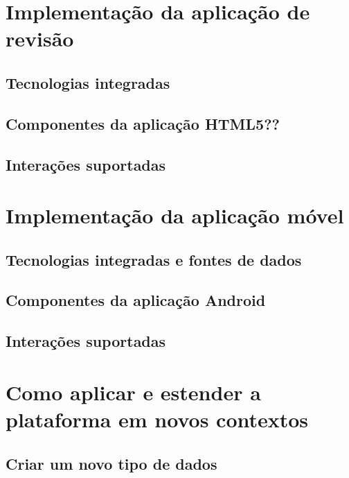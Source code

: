 \section{Implementação da aplicação de revisão}
\subsection{Tecnologias integradas}


\subsection{Componentes da aplicação HTML5??}

\subsection{Interações suportadas }


\section{Implementação da aplicação móvel}
\subsection{Tecnologias integradas e fontes de dados}
\subsection{Componentes da aplicação Android}
\subsection{Interações suportadas }




\section{Como aplicar e estender a plataforma em novos contextos}


\subsection{Criar um novo tipo de dados}


